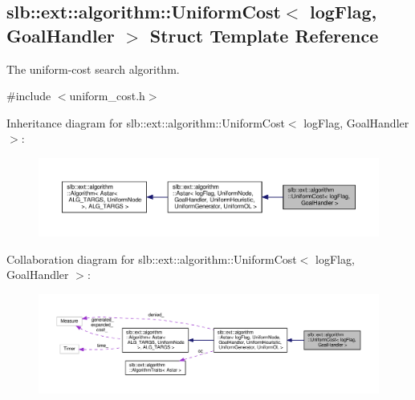 \hypertarget{structslb_1_1ext_1_1algorithm_1_1UniformCost}{}\subsection{slb\+:\+:ext\+:\+:algorithm\+:\+:Uniform\+Cost$<$ log\+Flag, Goal\+Handler $>$ Struct Template Reference}
\label{structslb_1_1ext_1_1algorithm_1_1UniformCost}


The uniform-\/cost search algorithm.  




{\ttfamily \#include $<$uniform\+\_\+cost.\+h$>$}



Inheritance diagram for slb\+:\+:ext\+:\+:algorithm\+:\+:Uniform\+Cost$<$ log\+Flag, Goal\+Handler $>$\+:\nopagebreak
\begin{figure}[H]
\begin{center}
\leavevmode
\includegraphics[width=350pt]{structslb_1_1ext_1_1algorithm_1_1UniformCost__inherit__graph}
\end{center}
\end{figure}


Collaboration diagram for slb\+:\+:ext\+:\+:algorithm\+:\+:Uniform\+Cost$<$ log\+Flag, Goal\+Handler $>$\+:\nopagebreak
\begin{figure}[H]
\begin{center}
\leavevmode
\includegraphics[width=350pt]{structslb_1_1ext_1_1algorithm_1_1UniformCost__coll__graph}
\end{center}
\end{figure}
